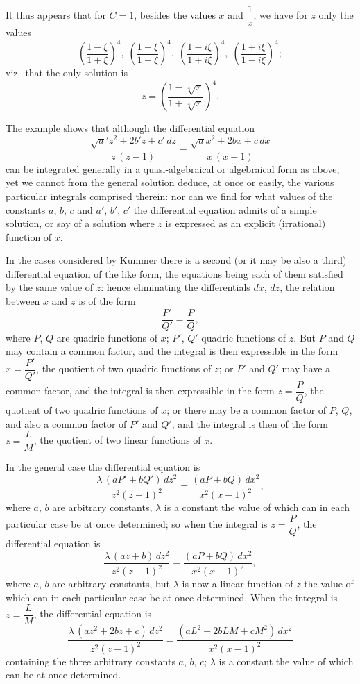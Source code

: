 \documentclass[11pt,a4paper]{book}
\begin{document}
It thus appears that for $C=1$, besides the values $x$ and $\dfrac{1}{x}$, we have for $z$ only the values
\[
\left(\frac{1-\xi}{1+\xi}\right)^4,\;
\left(\frac{1+\xi}{1-\xi}\right)^4,\;
\left(\frac{1-i\xi}{1+i\xi}\right)^4,\;
\left(\frac{1+i\xi}{1-i\xi}\right)^4;
\]
viz.\ that the only solution is
\[
z=\left(\frac{1-\sqrt[4]{x}}{1+\sqrt[4]{x}}\right)^4.
\]

The example shows that although the differential equation
\[
\frac{\surd a'z^2+2b'z+c'\,dz}{z\,(z-1)}
=\frac{\surd ax^2+2bx+c\,dx}{x\,(x-1)}
\]
can be integrated generally in a quasi-algebraical or algebraical form as above, yet we cannot from the general solution deduce, at once or easily, the various particular integrals comprised therein: nor can we find for what values of the constants $a$, $b$, $c$ and $a'$, $b'$, $c'$ the differential equation admits of a simple solution, or say of a solution where $z$ is expressed as an explicit (irrational) function of $x$.

In the cases considered by Kummer there is a second (or it may be also a third) differential equation of the like form, the equations being each of them satisfied by the same value of $z$: hence eliminating the differentials $dx$, $dz$, the relation between $x$ and $z$ is of the form
\[
\frac{P'}{Q'}=\frac{P}{Q},
\]
where $P$, $Q$ are quadric functions of $x$; $P'$, $Q'$ quadric functions of $z$. But $P$ and $Q$ may contain a common factor, and the integral is then expressible in the form $x=\dfrac{P'}{Q'}$, the quotient of two quadric functions of $z$; or $P'$ and $Q'$ may have a common factor, and the integral is then expressible in the form $z=\dfrac{P}{Q}$, the quotient of two quadric functions of $x$; or there may be a common factor of $P$, $Q$, and also a common factor of $P'$ and $Q'$, and the integral is then of the form $z=\dfrac{L}{M}$, the quotient of two linear functions of $x$.

In the general case the differential equation is
\[
\frac{\lambda\,(aP'+bQ')\,dz^2}{z^2(z-1)^2}
=\frac{(aP+bQ)\,dx^2}{x^2(x-1)^2},
\]
where $a$, $b$ are arbitrary constants, $\lambda$ is a constant the value of which can in each particular case be at once determined; so when the integral is $z=\dfrac{P}{Q}$, the differential equation is
\[
\frac{\lambda\,(az+b)\,dz^2}{z^2(z-1)^2}
=\frac{(aP+bQ)\,dx^2}{x^2(x-1)^2},
\]
where $a$, $b$ are arbitrary constants, but $\lambda$ is now a linear function of $z$ the value of which can in each particular case be at once determined. When the integral is $z=\dfrac{L}{M}$, the differential equation is
\[
\frac{\lambda\,(az^2+2bz+c)\,dz^2}{z^2(z-1)^2}
=\frac{(aL^2+2bLM+cM^2)\,dx^2}{x^2(x-1)^2}
\]
containing the three arbitrary constants $a$, $b$, $c$; $\lambda$ is a constant the value of which can be at once determined.
\end{document}
